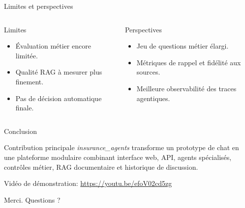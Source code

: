 \documentclass[aspectratio=169]{beamer}
\begin{document}
\begin{frame}{Limites et perspectives}
  \begin{columns}[T]
      \begin{alertblock}{Limites}
        \begin{itemize}
          \item Évaluation métier encore limitée.
          \item Qualité RAG à mesurer plus finement.
          \item Pas de décision automatique finale.
        \end{itemize}
      \end{alertblock}
      \begin{exampleblock}{Perspectives}
        \begin{itemize}
          \item Jeu de questions métier élargi.
          \item Métriques de rappel et fidélité aux sources.
          \item Meilleure observabilité des traces agentiques.
        \end{itemize}
      \end{exampleblock}
  \end{columns}
\end{frame}

\begin{frame}{Conclusion}
  \begin{block}{Contribution principale}
    \textit{insurance\_agents} transforme un prototype de chat en une plateforme modulaire combinant interface web, API, agents spécialisés, contrôles métier, RAG documentaire et historique de discussion.
  \end{block}

  \vspace{0.45em}
  \small Vidéo de démonstration: \url{https://youtu.be/efoV02cd5zg}

  \vspace{0.55em}
  \centering
  \Large Merci. Questions ?
\end{frame}
\end{document}
